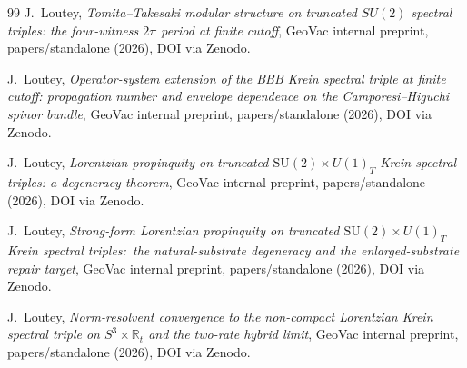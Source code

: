 \documentclass[11pt,a4paper]{article}
\theoremstyle{plain}
\theoremstyle{definition}
\newcommand{\sthree}{S^{3}}
\newcommand{\R}{\mathbb{R}}
\newcommand{\SU}{\mathrm{SU}}
\begin{document}
\begin{thebibliography}{99}
J.~Loutey,
\newblock \emph{Tomita--Takesaki modular structure on truncated
$SU(2)$ spectral triples: the four-witness $2\pi$ period at finite
cutoff},
\newblock GeoVac internal preprint, papers/standalone (2026),
DOI via Zenodo.

J.~Loutey,
\newblock \emph{Operator-system extension of the BBB Krein spectral
triple at finite cutoff: propagation number and envelope dependence on
the Camporesi--Higuchi spinor bundle},
\newblock GeoVac internal preprint, papers/standalone (2026),
DOI via Zenodo.

J.~Loutey,
\newblock \emph{Lorentzian propinquity on truncated
$\SU(2)\times U(1)_{T}$ Krein spectral triples: a degeneracy theorem},
\newblock GeoVac internal preprint, papers/standalone (2026),
DOI via Zenodo.

J.~Loutey,
\newblock \emph{Strong-form Lorentzian propinquity on
truncated $\SU(2) \times U(1)_{T}$ Krein spectral triples:\ the
natural-substrate degeneracy and the enlarged-substrate repair target},
\newblock GeoVac internal preprint, papers/standalone (2026),
DOI via Zenodo.

J.~Loutey,
\newblock \emph{Norm-resolvent convergence to the non-compact
Lorentzian Krein spectral triple on $\sthree\times\R_{t}$ and the
two-rate hybrid limit},
\newblock GeoVac internal preprint, papers/standalone (2026),
DOI via Zenodo.

\end{thebibliography}
\end{document}
